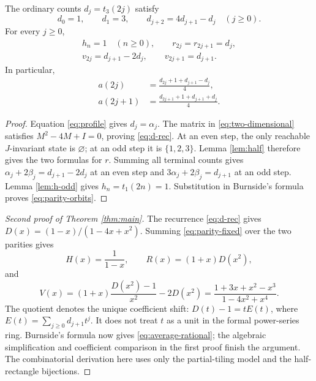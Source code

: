 \begin{proposition}\label{prop:parity}
The ordinary counts $d_j=t_3(2j)$ satisfy
\begin{equation}\label{eq:d-rec}
 d_0=1,\qquad d_1=3,\qquad
 d_{j+2}=4d_{j+1}-d_j\quad(j\ge0).
\end{equation}
For every $j\ge0$,
\begin{equation}\label{eq:parity-fixed}
\begin{gathered}
 h_n=1\quad(n\ge0),\qquad r_{2j}=r_{2j+1}=d_j,\\
 v_{2j}=d_{j+1}-2d_j,\qquad v_{2j+1}=d_{j+1}.
\end{gathered}
\end{equation}
In particular,
\begin{equation}\label{eq:parity-orbits}
\begin{split}
 a(2j)&=\frac{d_{2j}+1+d_{j+1}-d_j}{4},\\
 a(2j+1)&=\frac{d_{2j+1}+1+d_{j+1}+d_j}{4}.
\end{split}
\end{equation}
\end{proposition}
\begin{proof}
Equation \eqref{eq:profile} gives $d_j=\alpha_j$.
The matrix in \eqref{eq:two-dimensional} satisfies
$M^2-4M+I=0$, proving \eqref{eq:d-rec}.
At an even step, the only reachable $J$-invariant state is
$\varnothing$; at an odd step it is $\{1,2,3\}$.
Lemma \ref{lem:half} therefore gives the two formulas for $r$.
Summing all terminal counts gives
$\alpha_j+2\beta_j=d_{j+1}-2d_j$ at an even step and
$3\alpha_j+2\beta_j=d_{j+1}$ at an odd step.
Lemma \ref{lem:h-odd} gives $h_n=t_1(2n)=1$.
Substitution in Burnside's formula proves \eqref{eq:parity-orbits}.
\end{proof}

\begin{proof}[Second proof of Theorem \ref{thm:main}]
The recurrence \eqref{eq:d-rec} gives
$D(x)=(1-x)/(1-4x+x^2)$.
Summing \eqref{eq:parity-fixed} over the two parities gives
\[
 H(x)=\frac1{1-x},\qquad R(x)=(1+x)D(x^2),
\]
and
\[
 V(x)=(1+x)\frac{D(x^2)-1}{x^2}-2D(x^2)
 =\frac{1+3x+x^2-x^3}{1-4x^2+x^4}.
\]
The quotient denotes the unique coefficient shift: $D(t)-1=tE(t)$, where $E(t)=\sum_{j\ge0}d_{j+1}t^j$. It does not treat $t$ as a unit in the formal power-series ring.
Burnside's formula now gives \eqref{eq:average-rational};
the algebraic simplification and coefficient comparison in
the first proof finish the argument.
The combinatorial derivation here uses only the partial-tiling
model and the half-rectangle bijections.
\end{proof}
